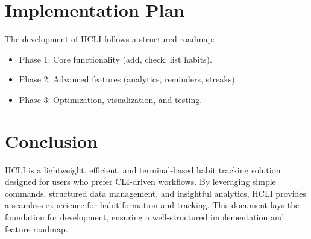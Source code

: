 \documentclass[a4paper,12pt]{article}
\begin{document}
\section{Implementation Plan}
The development of HCLI follows a structured roadmap:
\begin{itemize}
    \item Phase 1: Core functionality (add, check, list habits).
    \item Phase 2: Advanced features (analytics, reminders, streaks).
    \item Phase 3: Optimization, visualization, and testing.
\end{itemize}

\section{Conclusion}
HCLI is a lightweight, efficient, and terminal-based habit tracking solution designed for users who prefer CLI-driven workflows. By leveraging simple commands, structured data management, and insightful analytics, HCLI provides a seamless experience for habit formation and tracking. This document lays the foundation for development, ensuring a well-structured implementation and feature roadmap.
\end{document}
